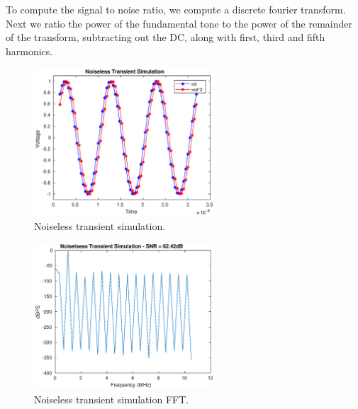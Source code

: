\documentclass[letterpaper, notitlepage]{revtex4-1}
\begin{document}
  To compute the signal to noise ratio, we compute a discrete fourier
  transform. Next we ratio the power of the fundamental tone to the power of
  the remainder of the transform, subtracting out the DC, along with first,
  third and fifth harmonics.

  \begin{figure}[h]
    \begin{center}
      \includegraphics[width=0.6\textwidth]{noiseless_transient_sig.eps}
      \caption{Noiseless transient simulation.}
      \label{fig:NoiselessTransient}
    \end{center}
  \end{figure}

  \begin{figure}[h]
    \begin{center}
      \includegraphics[width=0.6\textwidth]{noiseless_transient_fft.eps}
      \caption{Noiseless transient simulation FFT.}
      \label{fig:NoiselessTransientFFT}
    \end{center}
  \end{figure}

  \clearpage
\end{document}
